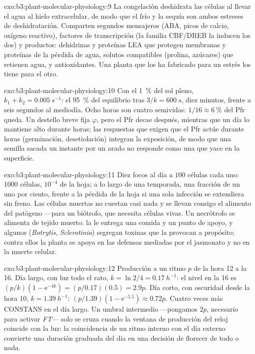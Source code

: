 \begin{solution}{exo:b3:plant-molecular-physiology:9}
La congelación deshidrata las células al llevar el agua al hielo
extracelular, de modo que el frío y la sequía son ambos estreses de
deshidratación. Comparten segundos mensajeros (ABA, picos de calcio,
oxígeno reactivo), factores de transcripción (la familia CBF/DREB la
inducen los dos) y productos: dehidrinas y proteínas LEA que protegen
membranas y proteínas de la pérdida de agua, solutos compatibles
(prolina, azúcares) que retienen agua, y antioxidantes. Una planta que
los ha fabricado para un estrés los tiene para el otro.
\end{solution}

\begin{solution}{exo:b3:plant-molecular-physiology:10}
Con el \qty{1}{\%} del sol pleno, $k_{1} + k_{2} = \qty{0.005}{s^{-1}}$:
el 95~\% del equilibrio tras $3/k = \qty{600}{s}$, diez minutos, frente
a seis segundos al mediodía. Ocho horas son cuatro semividas: $1/16 \approx
\qty{6}{\%}$ del Pfr queda. Un destello breve fija $\varphi$, pero el
Pfr decae después, mientras que un día lo mantiene alto durante horas;
las respuestas que exigen que el Pfr actúe durante horas (germinación,
desetiolación) integran la exposición, de modo que una semilla sacada
un instante por un arado no responde como una que yace en la
superficie.
\end{solution}

\begin{solution}{exo:b3:plant-molecular-physiology:11}
Diez focos al día a $100$ células cada uno: \num{1000} células,
$10^{-4}$ de la hoja; a lo largo de una temporada, una fracción de un
uno por ciento, frente a la pérdida de la hoja si una sola infección se
extendiera sin freno. Las células muertas no cuestan casi nada y se
llevan consigo el alimento del patógeno ---para un biótrofo, que
necesita células vivas. Un necrótrofo se alimenta de tejido muerto: la
 le entrega una comida y un punto de apoyo, y
algunos (\emph{Botrytis}, \emph{Sclerotinia}) segregan toxinas que la
provocan a propósito; contra ellos la planta se apoya en las defensas
mediadas por el jasmonato y no en la muerte celular.
\end{solution}

\begin{solution}{exo:b3:plant-molecular-physiology:12}
Producción a un ritmo $p$ de la hora 12 a la 16. Día largo, con luz
todo el rato, $k = \ln 2/4 = \qty{0.17}{h^{-1}}$: el nivel en la 16 es
$(p/k)(1 -
\mathrm{e}^{-4k}) = (p/0.17)(0.5) = 2.9p$. Día corto, con oscuridad
desde la hora 10, $k = \qty{1.39}{h^{-1}}$: $(p/1.39)(1 - \mathrm{e}^{-5.5})
\approx 0.72p$. Cuatro veces más CONSTANS en el día largo. Un umbral
intermedio ---pongamos $2p$, necesario para activar \emph{FT}--- solo
se cruza cuando la ventana de producción del reloj coincide con la luz:
la coincidencia de un ritmo interno con el día externo convierte una
duración graduada del día en una decisión de florecer de todo o nada.
\end{solution}

